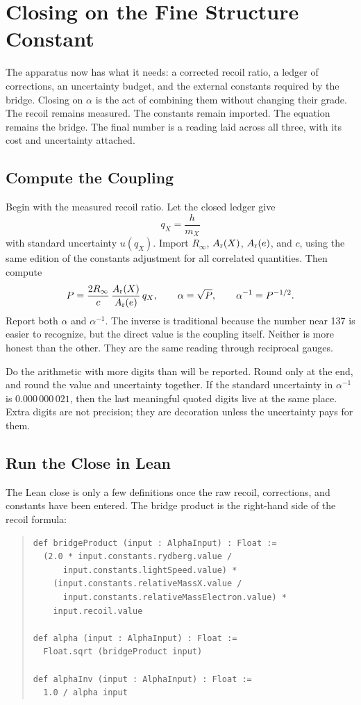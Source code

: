 \chapter{Closing on the Fine Structure Constant}

The apparatus now has what it needs: a corrected recoil ratio, a ledger of corrections, an uncertainty budget,
and the external constants required by the bridge. Closing on \(\alpha\) is the act of combining them without
changing their grade. The recoil remains measured. The constants remain imported. The equation remains the
bridge. The final number is a reading laid across all three, with its cost and uncertainty attached.

\section{Compute the Coupling}

Begin with the measured recoil ratio. Let the closed ledger give
\[
  q_X = \frac{h}{m_X}
\]
with standard uncertainty \(u(q_X)\). Import \(R_\infty\), \(A_{\rm r}(X)\), \(A_{\rm r}(e)\), and \(c\), using
the same edition of the constants adjustment for all correlated quantities. Then compute
\[
  P =
  \frac{2R_\infty}{c}\,
  \frac{A_{\rm r}(X)}{A_{\rm r}(e)}\,
  q_X,
  \qquad
  \alpha = \sqrt{P},
  \qquad
  \alpha^{-1} = P^{-1/2}.
\]
Report both \(\alpha\) and \(\alpha^{-1}\). The inverse is traditional because the number near 137 is easier to
recognize, but the direct value is the coupling itself. Neither is more honest than the other. They are the same
reading through reciprocal gauges.

Do the arithmetic with more digits than will be reported. Round only at the end, and round the value and
uncertainty together. If the standard uncertainty in \(\alpha^{-1}\) is \(0.000\,000\,021\), then the last
meaningful quoted digits live at the same place. Extra digits are not precision; they are decoration unless the
uncertainty pays for them.

\section{Run the Close in Lean}

The Lean close is only a few definitions once the raw recoil, corrections, and constants have been entered. The
bridge product is the right-hand side of the recoil formula:

\begin{quote}\small
\begin{verbatim}
def bridgeProduct (input : AlphaInput) : Float :=
  (2.0 * input.constants.rydberg.value /
      input.constants.lightSpeed.value) *
    (input.constants.relativeMassX.value /
      input.constants.relativeMassElectron.value) *
    input.recoil.value

def alpha (input : AlphaInput) : Float :=
  Float.sqrt (bridgeProduct input)

def alphaInv (input : AlphaInput) : Float :=
  1.0 / alpha input
\end{verbatim}
\end{quote}

